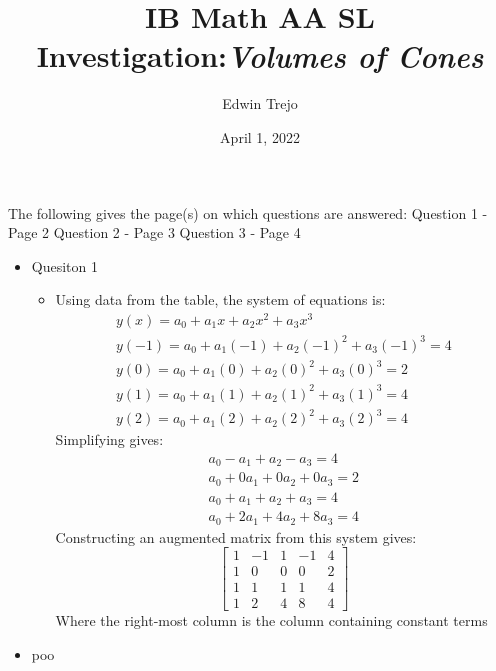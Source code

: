 \documentclass{article}
\title{IB Math AA SL Investigation:\emph{Volumes of Cones}}
\author{Edwin Trejo}
\date{April 1, 2022}
\begin{document}
\maketitle

The following gives the page(s) on which questions are answered: \newline
Question 1 - Page 2 \newline
Question 2 - Page 3 \newline
Question 3 - Page 4

\newpage

\begin{itemize}

    \item Quesiton 1
    \begin{itemize}
        \item Using data from the table, the system of equations is:
        \begin{align*}
            y(x) = a_0 + a_1x + a_2x^2 + a_3x^3 \\
            y(-1) = a_0 + a_1(-1) + a_2(-1)^2 + a_3(-1)^3 = 4 \\
            y(0) = a_0 + a_1(0) + a_2(0)^2 + a_3(0)^3 = 2 \\
            y(1) = a_0 + a_1(1) + a_2(1)^2 + a_3(1)^3 = 4 \\
            y(2) = a_0 + a_1(2) + a_2(2)^2 + a_3(2)^3 = 4
        \end{align*}
        Simplifying gives:
        \begin{align*}
            a_0 - a_1 + a_2 - a_3 = 4 \\
            a_0 + 0a_1 + 0a_2 + 0a_3 = 2 \\
            a_0 + a_1 + a_2 + a_3 = 4 \\
            a_0 + 2a_1 + 4a_2 + 8a_3 = 4
        \end{align*}
        Constructing an augmented matrix from this system gives:
        $$\begin{bmatrix}
            1 & -1 & 1 & -1 & 4 \\
            1 & 0 & 0 & 0 & 2 \\
            1 & 1 & 1 & 1 & 4 \\
            1 & 2 & 4 & 8 & 4 
        \end{bmatrix}$$
        Where the right-most column is the column containing constant terms
    \end{itemize}

    \newpage 
    \item poo

\end{itemize}
\end{document}
